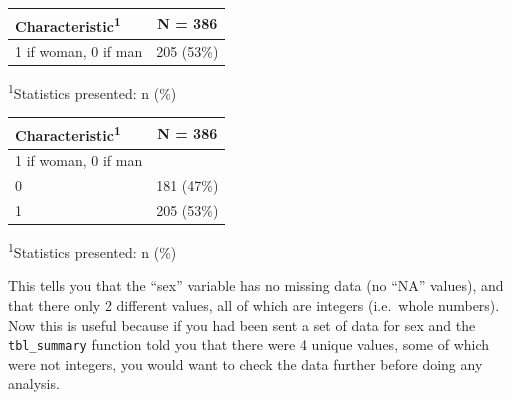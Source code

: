 \documentclass[]{book}
\newenvironment{Shaded}{\begin{snugshade}}{\end{snugshade}}
\newcommand{\CommentTok}[1]{\textcolor[rgb]{0.56,0.35,0.01}{\textit{#1}}}
\newcommand{\DataTypeTok}[1]{\textcolor[rgb]{0.13,0.29,0.53}{#1}}
\newcommand{\KeywordTok}[1]{\textcolor[rgb]{0.13,0.29,0.53}{\textbf{#1}}}
\newcommand{\NormalTok}[1]{#1}
\newcommand{\OperatorTok}[1]{\textcolor[rgb]{0.81,0.36,0.00}{\textbf{#1}}}
\newcommand{\StringTok}[1]{\textcolor[rgb]{0.31,0.60,0.02}{#1}}
\begin{document}
\captionsetup[table]{labelformat=empty,skip=1pt}
\begin{longtable}{lc}
\toprule
\textbf{Characteristic}\textsuperscript{1} & \textbf{N = 386} \\ 
\midrule
1 if woman, 0 if man & 205 (53\%) \\ 
\bottomrule
\end{longtable}
\vspace{-5mm}
\begin{minipage}{\linewidth}
\textsuperscript{1}Statistics presented: n (\%) \\ 
\end{minipage}

\begin{Shaded}
\end{Shaded}

\captionsetup[table]{labelformat=empty,skip=1pt}
\begin{longtable}{lc}
\toprule
\textbf{Characteristic}\textsuperscript{1} & \textbf{N = 386} \\ 
\midrule
1 if woman, 0 if man &  \\ 
0 & 181 (47\%) \\ 
1 & 205 (53\%) \\ 
\bottomrule
\end{longtable}
\vspace{-5mm}
\begin{minipage}{\linewidth}
\textsuperscript{1}Statistics presented: n (\%) \\ 
\end{minipage}

This tells you that the ``sex'' variable has no missing data (no ``NA''
values), and that there only 2 different values, all of which are
integers (i.e.~whole numbers). Now this is useful because if you had
been sent a set of data for sex and the \texttt{tbl\_summary} function
told you that there were 4 unique values, some of which were not
integers, you would want to check the data further before doing any
analysis.
\end{document}
